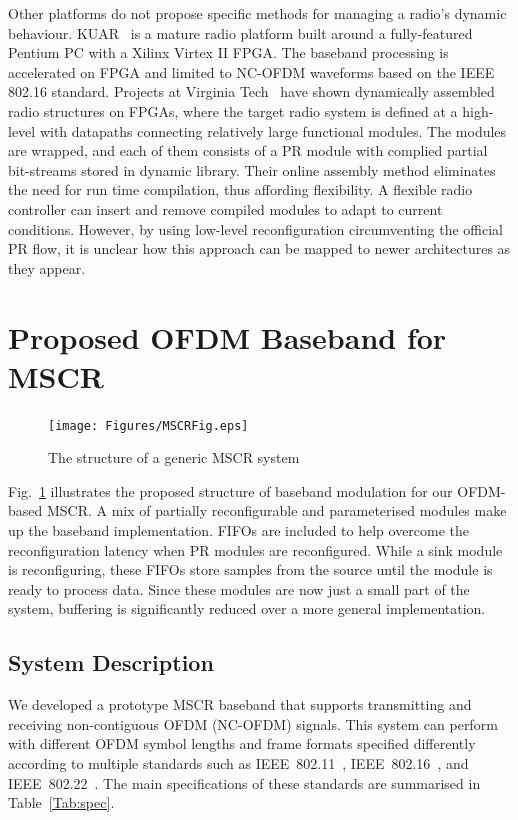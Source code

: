 Other platforms do not propose specific methods for managing a radio's dynamic behaviour.
KUAR~\cite{Minden2007} is a mature radio platform built around a fully-featured Pentium PC with a Xilinx Virtex II FPGA.
The baseband processing is accelerated on FPGA and limited to NC-OFDM waveforms based on the IEEE 802.16 standard.
Projects at Virginia Tech~\cite{athanaswires} have shown dynamically assembled radio structures on FPGAs, where the target radio system is defined at a high-level with datapaths connecting relatively large functional modules.
The modules are wrapped, and each of them consists of a PR module with complied partial bit-streams stored in dynamic library.
Their online assembly method eliminates the need for run time compilation, thus affording flexibility.
A flexible radio controller can insert and remove compiled modules to adapt to current conditions.
However, by using low-level reconfiguration circumventing the official PR flow, it is unclear how this approach can be mapped to newer architectures as they appear.

\section{Proposed OFDM Baseband for MSCR}
\begin{figure}
\texttt{[image: Figures/MSCRFig.eps]}
\caption{The structure of a generic MSCR system}
\label{fig:struc}
\end{figure}

Fig.~\ref{fig:struc} illustrates the proposed structure of baseband modulation for our OFDM-based MSCR.
A mix of partially reconfigurable and parameterised modules make up the baseband implementation.
FIFOs are included to help overcome the reconfiguration latency when PR modules are reconfigured.
While a sink module is reconfiguring, these FIFOs store samples from the source until the module is ready to process data.
Since these modules are now just a small part of the system, buffering is significantly reduced over a more general implementation.

\subsection{System Description}

We developed a prototype MSCR baseband that supports transmitting and receiving non-contiguous OFDM (NC-OFDM) signals.
This system can perform with different OFDM symbol lengths and frame formats specified differently according to multiple standards such as IEEE~802.11~\cite{IEEE80211}, IEEE~802.16~\cite{IEEE80216}, and IEEE~802.22~\cite{IEEE80222}.
The main specifications of these standards are summarised in Table~\ref{Tab:spec}.

